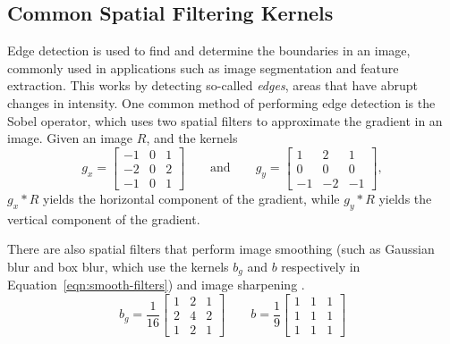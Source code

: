 \subsection{Common Spatial Filtering Kernels}
Edge detection is used to find and determine the boundaries in an image, commonly used in applications such as image segmentation and feature extraction. This works by detecting so-called \textit{edges}, areas that have abrupt changes in intensity.
One common method of performing edge detection is the Sobel operator, which uses two spatial filters to approximate the gradient in an image. Given an image $R$, and the kernels
\begin{equation}
    g_x =
    \begin{bmatrix}
        -1 & 0 & 1 \\
        -2 & 0 & 2 \\
        -1 & 0 & 1
    \end{bmatrix}
    \qquad\text{and}\qquad
    g_y =
    \begin{bmatrix}
        1 & 2 & 1 \\
        0 & 0 & 0 \\
        -1 & -2 & -1
    \end{bmatrix},
\end{equation}
$g_x \ast R$ yields the horizontal component of the gradient, while $g_y \ast R$ yields the vertical component of the gradient.

There are also spatial filters that perform image smoothing (such as Gaussian blur and box blur, which use the kernels $b_g$ and $b$ respectively in Equation~\ref{eqn:smooth-filters}) and image sharpening \cite{gonzalez_digital_2008}.
\begin{equation}
    \label{eqn:smooth-filters}
    b_g = \frac{1}{16}
    \begin{bmatrix}
        1 & 2 & 1 \\
        2 & 4 & 2 \\
        1 & 2 & 1
    \end{bmatrix}
    \qquad
    b = \frac{1}{9}
    \begin{bmatrix}
        1 & 1 & 1 \\
        1 & 1 & 1 \\
        1 & 1 & 1
    \end{bmatrix}
\end{equation}
